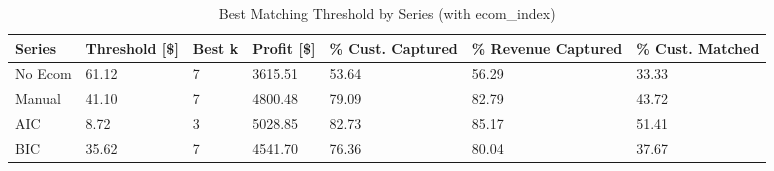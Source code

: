 \begin{table}[ht]
\centering
\caption{Best Matching Threshold by Series (with ecom\_index)} 
\label{tab:series_max}
\begin{tabular}{>{\centering\let\newline\\\arraybackslash\hspace{0pt}}m{1.50cm}>{\centering\let\newline\\\arraybackslash\hspace{0pt}}m{2.00cm}>{\centering\let\newline\\\arraybackslash\hspace{0pt}}m{1.50cm}>{\centering\let\newline\\\arraybackslash\hspace{0pt}}m{2.00cm}>{\centering\let\newline\\\arraybackslash\hspace{0pt}}m{2.00cm}>{\centering\let\newline\\\arraybackslash\hspace{0pt}}m{2.00cm}>{\centering\let\newline\\\arraybackslash\hspace{0pt}}m{2.00cm}}
  \hline
Series & Threshold [\$] & Best k & Profit [\$] & \% Cust. Captured & \% Revenue Captured & \% Cust. Matched \\ 
  \hline
No Ecom & 61.12 &   7 & 3615.51 & 53.64 & 56.29 & 33.33 \\ 
  Manual & 41.10 &   7 & 4800.48 & 79.09 & 82.79 & 43.72 \\ 
  AIC & 8.72 &   3 & 5028.85 & 82.73 & 85.17 & 51.41 \\ 
  BIC & 35.62 &   7 & 4541.70 & 76.36 & 80.04 & 37.67 \\ 
   \hline
\end{tabular}
\end{table}
